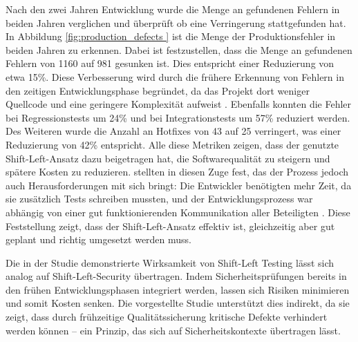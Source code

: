 Nach den zwei Jahren Entwicklung wurde die Menge an gefundenen Fehlern in beiden Jahren verglichen und überprüft ob eine Verringerung stattgefunden hat. In Abbildung \ref{fig:production_defects } ist die Menge der Produktionsfehler in beiden Jahren zu erkennen. Dabei ist festzustellen, dass die Menge an gefundenen Fehlern von 1160 auf 981 gesunken ist. Dies entspricht einer Reduzierung von etwa 15\%. Diese Verbesserung wird durch die frühere Erkennung von Fehlern in den zeitigen Entwicklungsphase begründet, da das Projekt dort weniger Quellcode und eine geringere Komplexität aufweist \cite{andriadi_impact_2023}. Ebenfalls konnten die Fehler bei Regressionstests um 24\% und bei Integrationstests um 57\% reduziert werden. Des Weiteren wurde die Anzahl an Hotfixes von 43 auf 25 verringert, was einer Reduzierung von 42\% entspricht. Alle diese Metriken zeigen, dass der genutzte Shift-Left-Ansatz dazu beigetragen hat, die Softwarequalität zu steigern und spätere Kosten zu reduzieren. \citet{andriadi_impact_2023} stellten in diesen Zuge fest, das der Prozess jedoch auch Herausforderungen mit sich bringt: Die Entwickler benötigten mehr Zeit, da sie zusätzlich Tests schreiben mussten, und der Entwicklungsprozess war abhängig von einer gut funktionierenden Kommunikation aller Beteiligten \cite{andriadi_impact_2023}. Diese Feststellung zeigt, dass der Shift-Left-Ansatz effektiv ist, gleichzeitig aber gut geplant und richtig umgesetzt werden muss.

Die in der Studie demonstrierte Wirksamkeit von Shift-Left Testing lässt sich analog auf Shift-Left-Security übertragen. Indem Sicherheitsprüfungen bereits in den frühen Entwicklungsphasen integriert werden, lassen sich Risiken minimieren und somit Kosten senken. Die vorgestellte Studie unterstützt dies indirekt, da sie zeigt, dass durch frühzeitige Qualitätssicherung kritische Defekte verhindert werden können – ein Prinzip, das sich auf Sicherheitskontexte übertragen lässt.